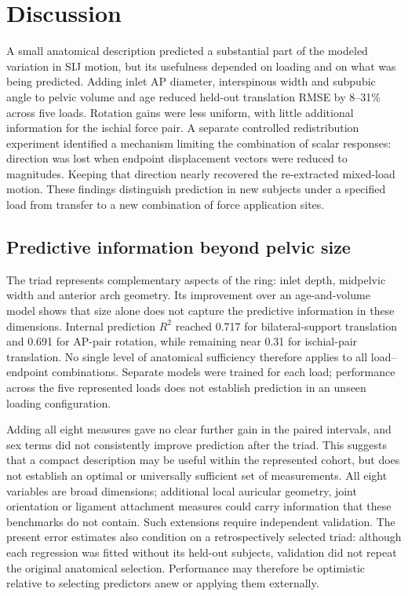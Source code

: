 \section{Discussion}
A small anatomical description predicted a substantial part of the modeled variation in SIJ motion, but its usefulness depended on loading and on what was being predicted. Adding inlet AP diameter, interspinous width and subpubic angle to pelvic volume and age reduced held-out translation RMSE by 8--31\% across five loads. Rotation gains were less uniform, with little additional information for the ischial force pair. A separate controlled redistribution experiment identified a mechanism limiting the combination of scalar responses: direction was lost when endpoint displacement vectors were reduced to magnitudes. Keeping that direction nearly recovered the re-extracted mixed-load motion. These findings distinguish prediction in new subjects under a specified load from transfer to a new combination of force application sites.

\subsection*{Predictive information beyond pelvic size}
The triad represents complementary aspects of the ring: inlet depth, midpelvic width and anterior arch geometry. Its improvement over an age-and-volume model shows that size alone does not capture the predictive information in these dimensions. Internal prediction $R^2$ reached 0.717 for bilateral-support translation and 0.691 for AP-pair rotation, while remaining near 0.31 for ischial-pair translation. No single level of anatomical sufficiency therefore applies to all load--endpoint combinations. Separate models were trained for each load; performance across the five represented loads does not establish prediction in an unseen loading configuration.

Adding all eight measures gave no clear further gain in the paired intervals, and sex terms did not consistently improve prediction after the triad. This suggests that a compact description may be useful within the represented cohort, but does not establish an optimal or universally sufficient set of measurements. All eight variables are broad dimensions; additional local auricular geometry, joint orientation or ligament attachment measures could carry information that these benchmarks do not contain. Such extensions require independent validation. The present error estimates also condition on a retrospectively selected triad: although each regression was fitted without its held-out subjects, validation did not repeat the original anatomical selection. Performance may therefore be optimistic relative to selecting predictors anew or applying them externally.

